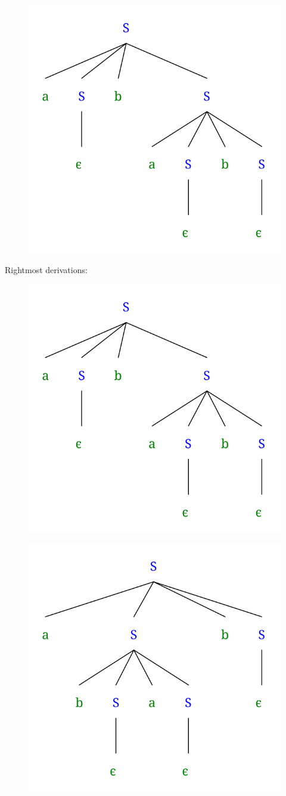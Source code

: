 \documentclass{article}
\begin{document}
    \begin{figure}[H]
        \centering
        \includegraphics[width=.7\textwidth]{hw2-1c2.png}
    \end{figure}

    Rightmost derivations:
    \begin{figure}[H]
        \centering
        \includegraphics[width=.7\textwidth]{hw2-1c3.png}
    \end{figure}

    \begin{figure}[H]
        \centering
        \includegraphics[width=.7\textwidth]{hw2-1c4.png}
    \end{figure}
\end{document}
